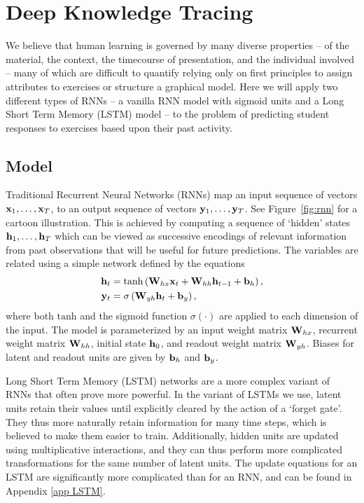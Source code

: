 \section{Deep Knowledge Tracing}

We believe that human learning is governed by many diverse properties -- of the material, the context, the timecourse of presentation, and the individual involved -- many of which are difficult to quantify relying only on first principles to assign attributes to exercises or structure a graphical model. Here we will apply two different types of RNNs -- a vanilla RNN model with sigmoid units and a Long Short Term Memory (LSTM) model -- to the problem of predicting student responses to exercises based upon their past activity.

\subsection{Model}

Traditional Recurrent Neural Networks (RNNs) map an input sequence of vectors $\mathbf x_1, \dots ,\mathbf x_T$, to an output sequence of vectors $\mathbf y_1,\dots,\mathbf y_T$. See Figure~\ref{fig:rnn} for a cartoon illustration. This is achieved by computing a sequence of `hidden' states $\mathbf h_1 , \dots , \mathbf h_T$  which can be viewed as successive encodings of relevant information from past observations that will be useful for future predictions. The variables are related using a simple network defined by the equations
\begin{align}
    \mathbf h_t &= \mathrm{tanh}\left(\mathbf W_{hx} \mathbf x_t + \mathbf W_{hh} \mathbf h_{t-1} + \mathbf b_h\right), \\
    \mathbf y_t &= \sigma\left(\mathbf W_{yh} \mathbf h_t + \mathbf b_y\right),
\end{align}
where both $\mathrm{tanh}$ and the sigmoid function $\sigma\left(\cdot\right)$ are applied to each dimension of the input.
The model is parameterized by an input weight matrix $\mathbf W_{hx}$, recurrent weight matrix $\mathbf W_{hh}$, initial state $\mathbf h_0$, and readout weight matrix $\mathbf W_{yh}$.
Biases for latent and readout units are given by $\mathbf b_h$ and $\mathbf b_y$.

Long Short Term Memory (LSTM) networks \cite{hochreiter1997long} are a more complex variant of RNNs that often prove more powerful.
In the variant of LSTMs we use, latent units retain their values until explicitly cleared by the action of a `forget gate'.
They thus more naturally retain information for many time steps, which is believed to make them easier to train.
Additionally, hidden units are updated using multiplicative interactions, and they can thus perform more complicated transformations for the same number of latent units.
The update equations for an LSTM are significantly more complicated than for an RNN, and can be found in Appendix \ref{app LSTM}.

